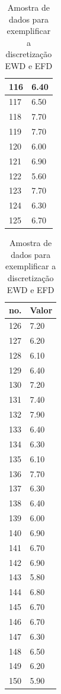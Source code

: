 \begin{table}[!ht]
\begin{tabular}{ |l|l| }
116	&	6.40	\\ \hline
117	&	6.50	\\ \hline
118	&	7.70	\\ \hline
119	&	7.70	\\ \hline
120	&	6.00	\\ \hline
121	&	6.90	\\ \hline
122	&	5.60	\\ \hline
123	&	7.70	\\ \hline
124	&	6.30	\\ \hline
125	&	6.70	\\ \hline
\end{tabular}
\begin{tabular}{ |l|l| }
\hline
 no. & Valor \\ \hline
126	&	7.20	\\ \hline
127	&	6.20	\\ \hline
128	&	6.10	\\ \hline
129	&	6.40	\\ \hline
130	&	7.20	\\ \hline
131	&	7.40	\\ \hline
132	&	7.90	\\ \hline
133	&	6.40	\\ \hline
134	&	6.30	\\ \hline
135	&	6.10	\\ \hline
136	&	7.70	\\ \hline
137	&	6.30	\\ \hline
138	&	6.40	\\ \hline
139	&	6.00	\\ \hline
140	&	6.90	\\ \hline
141	&	6.70	\\ \hline
142	&	6.90	\\ \hline
143	&	5.80	\\ \hline
144	&	6.80	\\ \hline
145	&	6.70	\\ \hline
146	&	6.70	\\ \hline
147	&	6.30	\\ \hline
148	&	6.50	\\ \hline
149	&	6.20	\\ \hline
150	&	5.90	\\ \hline

\end{tabular}
\caption{Amostra de dados para exemplificar a discretização EWD e EFD}
\label{tab:amostraDiscret}
\end{table}


